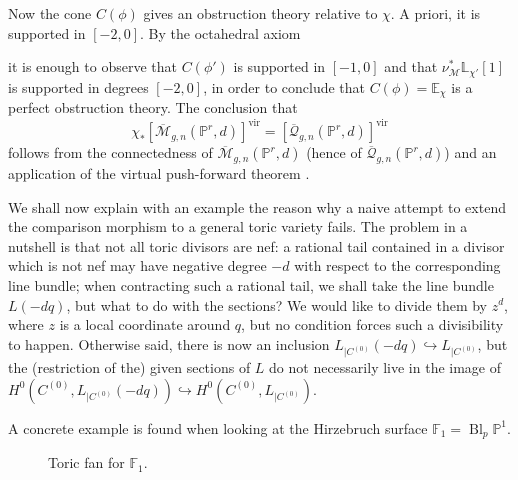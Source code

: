 \documentclass[11pt]{amsart}
\newcommand{\M}[4]{\overline{\mathcal M}_{#1,#2}(#3,#4)}
\newcommand{\Q}[4]{\overline{\mathcal Q}_{#1,#2}(#3,#4)}
\newcommand{\PP}{\mathbb P}
\newcommand{\comp}{\chi}
\theoremstyle{plain}
\theoremstyle{definition}
\begin{document}
Now the cone $C(\phi)$ gives an obstruction theory relative to $\comp$. A priori, it is supported in $[-2,0]$. By the octahedral axiom
\begin{center}
\end{center}
it is enough to observe that $C(\phi')$ is supported in $[-1,0]$ \cite[Lemma 4.20]{Manolache-Push} and that $\nu_{\mathcal M}^*\mathbb L_{\comp'}{[1]}$ is supported in degrees $[-2,0]$, in order to conclude that $C(\phi)=\mathbb E_{\comp}$ is a perfect obstruction theory. The conclusion that
\[
 \comp_*[\M{g}{n}{\PP^r}{d}]^{\text{vir}}=[\Q{g}{n}{\PP^r}{d}]^{\text{vir}}
\]
follows from the connectedness of $\M{g}{n}{\PP^r}{d}$ \cite{KP} (hence of $\Q{g}{n}{\PP^r}{d}$) and an application of the virtual push-forward theorem \cite[Proposition 4.21]{Manolache-Push}.

We shall now explain with an example the reason why a naive attempt to extend the comparison morphism to a general toric variety fails. The problem in a nutshell is that not all toric divisors are nef: a rational tail contained in a divisor which is not nef may have negative degree $-d$ with respect to the corresponding line bundle; when contracting such a rational tail, we shall take the line bundle $L(-dq)$, but what to do with the sections? We would like to divide them by $z^d$, where $z$ is a local coordinate around $q$, but no condition forces such a divisibility to happen. Otherwise said, there is now an inclusion $L_{|C^{(0)}}(-dq)\hookrightarrow L_{|C^{(0)}}$, but the (restriction of the) given sections of $L$ do not necessarily live in the image of $H^0(C^{(0)},L_{|C^{(0)}}(-dq))\hookrightarrow H^0(C^{(0)},L_{|C^{(0)}})$.

A concrete example is found when looking at the Hirzebruch surface $\mathbb F_1=\operatorname{Bl}_{p}\PP^1$.
\begin{figure}
\caption{Toric fan for $\mathbb F_1$.}
\end{figure}
\end{document}
